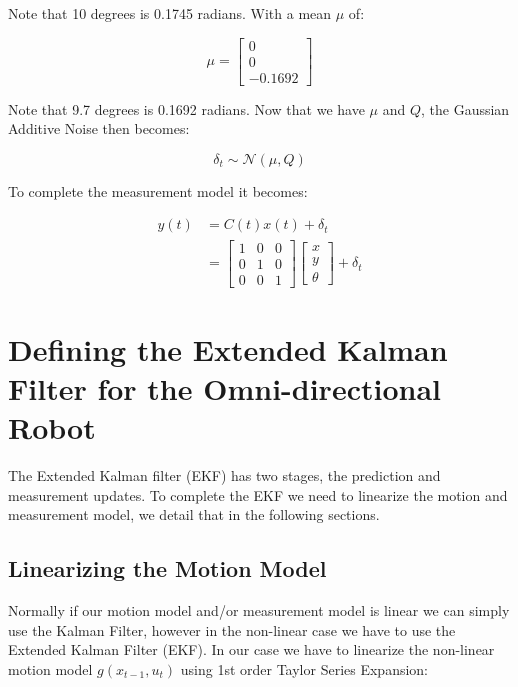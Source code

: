 \documentclass{article}
\begin{document}
Note that 10 degrees is 0.1745 radians. With a mean $\mu$ of:

\begin{equation}
	\mu = 
	\begin{bmatrix}
		0 \\
		0 \\
		-0.1692 
	\end{bmatrix}
\end{equation}

Note that 9.7 degrees is 0.1692 radians. Now that we have $\mu$ and $Q$, the 
Gaussian Additive Noise then becomes:

\begin{equation}
	\delta_{t} \sim \mathcal{N} (\mu, Q)
\end{equation}

To complete the measurement model it becomes:

\begin{align}
	y(t) &= C(t) x(t) + \delta_{t} \\
	&=
	\begin{bmatrix}
		1 & 0 & 0 \\
		0 & 1 & 0 \\
		0 & 0 & 1
	\end{bmatrix}
	\begin{bmatrix}
		x \\
		y \\
		\theta 
	\end{bmatrix}
	+
	\delta_{t}
\end{align}




\newpage
\section{Defining the Extended Kalman Filter for the Omni-directional Robot}
\label{sec:ekf_defintion}

The Extended Kalman filter (EKF) has two stages, the prediction and measurement 
updates. To complete the EKF we need to linearize the motion and measurement 
model, we detail that in the following sections.

\subsection{Linearizing the Motion Model}
\label{subsec:ekf_motion_model_linearization}
Normally if our motion model and/or measurement model is linear we can simply 
use the Kalman Filter, however in the non-linear case we have to use the 
Extended Kalman Filter (EKF). In our case we have to linearize the non-linear 
motion model $g(x_{t-1}, u_{t})$ using 1st order Taylor Series Expansion:
\end{document}
